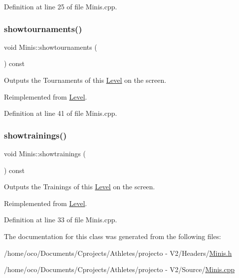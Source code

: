 Definition at line 25 of file Minis.\+cpp.

\hypertarget{class_minis_a1a8d585f0c4b745c9c703cc6449c778d}{}\label{class_minis_a1a8d585f0c4b745c9c703cc6449c778d} 
\subsubsection{\texorpdfstring{showtournaments()}{showtournaments()}}
{\footnotesize\ttfamily void Minis\+::showtournaments (\begin{DoxyParamCaption}{ }\end{DoxyParamCaption}) const\hspace{0.3cm}{\ttfamily [virtual]}}



Outputs the Tournaments of this \hyperlink{class_level}{Level} on the screen. 



Reimplemented from \hyperlink{class_level_a757c4547f3b8f7c7ecb02c7e0e6cd7c9}{Level}.



Definition at line 41 of file Minis.\+cpp.

\hypertarget{class_minis_a69059ad5f89289c70ce6dec4906e02f3}{}\label{class_minis_a69059ad5f89289c70ce6dec4906e02f3} 
\subsubsection{\texorpdfstring{showtrainings()}{showtrainings()}}
{\footnotesize\ttfamily void Minis\+::showtrainings (\begin{DoxyParamCaption}{ }\end{DoxyParamCaption}) const\hspace{0.3cm}{\ttfamily [virtual]}}



Outputs the Trainings of this \hyperlink{class_level}{Level} on the screen. 



Reimplemented from \hyperlink{class_level_a4101cb725b1fd0c0836834c92b190363}{Level}.



Definition at line 33 of file Minis.\+cpp.



The documentation for this class was generated from the following files\+:\begin{DoxyCompactItemize}
\item 
/home/oco/\+Documents/\+Cprojects/\+Athletes/projecto -\/ V2/\+Headers/\hyperlink{_minis_8h}{Minis.\+h}\item 
/home/oco/\+Documents/\+Cprojects/\+Athletes/projecto -\/ V2/\+Source/\hyperlink{_minis_8cpp}{Minis.\+cpp}\end{DoxyCompactItemize}
